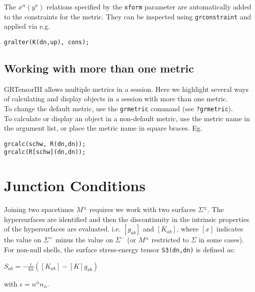 \documentclass{article}
\begin{document}
The  $x^\alpha(y^a)$ relations specified by the \texttt{xform} parameter are automatically added to the constraints for the
metric. They can be inspected using \texttt{grconstraint} and applied via e.g.
\begin{verbatim}
gralter(K(dn,up), cons); 
\end{verbatim}

\subsection{Working with more than one metric}
GRTensorIII allows multiple metrics in a session. Here we highlight several ways of calculating and display objects in a session
with more than one metric. \\

To change the default metric, use the \texttt{grmetric} command (see \texttt{?grmetric}).\\

To calculate or display an object in a non-default metric, use the metric name in the argument list, or place the metric name in 
square braces. Eg.
\begin{verbatim}
grcalc(schw, R(dn,dn));
grcalc(R[schw](dn,dn));
\end{verbatim}

\FloatBarrier
\section{Junction Conditions}
Joining two spacetimes $M^{\pm}$ requires we work with two surfaces $\Sigma^{\pm}$. The hypersurfaces are identified and then
the discontinuity in the intrinsic properties of the hypersurfaces are evaluated. i.e. $\left[ g_{ab} \right]$ and
$\left[ K_{ab} \right]$, where $\left[ x \right]$ indicates the value on  $\Sigma^{+}$ minus the value on $\Sigma^{-}$
(or $M^\pm$ restricted to $\Sigma$ in some cases). \\

For non-null shells, the surface stress-energy tensor \texttt{S3(dn,dn)} is defined as:
\begin{center}
$S_{ab} = - \frac{\epsilon}{8 \pi} \left( \left[K_{ab}\right] - \left[K\right]g_{ab} \right)$
\end{center}
with $\epsilon = n^\alpha n_\alpha$. \\
\end{document}
